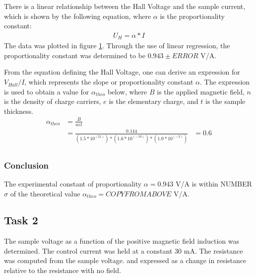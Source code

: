 \documentclass[a4paper]{article}
\begin{document}
\qq There is a linear relationship between the Hall Voltage and the sample 
current, which is shown by the following equation, where $\alpha$ is
the proportionality constant:
\begin{align*}
U_H = \alpha * I
\end{align*}
The data was plotted in figure \ref{task21plot}. Through the use of
linear regression, the proportionality constant was determined to be
$0.943 \pm ERROR$ V/A.

\begin{figure}[H]
\centering
\label{task21plot}
\end{figure}

\qq From the equation defining the Hall Voltage, one can derive an
expression for $V_{Hall}/I$, which represents the slope or
proportionality constant $\alpha$. The expression is used to obtain a
value for $\alpha_{theo}$ below, where $B$ is the applied magnetic
field, $n$ is the density of charge carriers, $e$ is the elementary
charge, and $t$ is the sample thickness.
\begin{align*}
\alpha_{theo} &= \frac{B}{net} \\
              &= \frac{0.144}{(1.5 * 10^(21))*(1.6 * 10^(-19))*(1.0 * 10^(-3))}
			  &= 0.6 \\
\end{align*}

\subsubsection{Conclusion}
The experimental constant of proportionality $\alpha = 0.943 $ V/A is
within NUMBER $\sigma$ of the theoretical value $\alpha_{theo} =
COPYFROMABOVE$ V/A.

\subsection{Task 2}

\qq The sample voltage as a function of the positive magnetic field
induction was determined. The control current was held at a constant
30 mA. The resistance was computed from the sample voltage. and
expressed as a change in resistance relative to the resistance with no
field.
\end{document}
